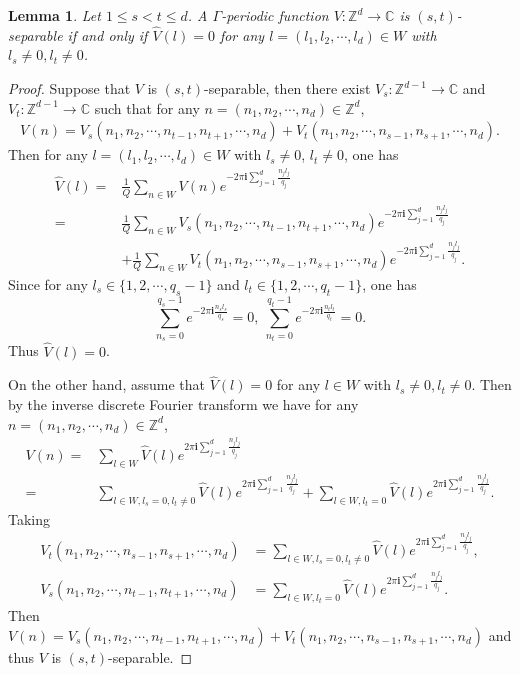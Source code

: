 \documentclass[12pt,letterpaper]{amsart}
\newtheorem{lemma}{Lemma}[section]
\def\C{{\mathbb C}}
\def\Z{{\mathbb Z}}
\begin{document}
\begin{lemma}\label{stseparablefermi}
Let $1\leq s<t\leq d$. A $\Gamma$-periodic function $V:\Z^d\to \C$ is $(s,t)$-separable if and only if $\hat{V}(l)=0$ for any $l=(l_1,l_2,\cdots,l_d)\in W$ with $l_s\neq 0,l_t\neq 0$.
\end{lemma}
\begin{proof}
Suppose that $V$ is $(s,t)$-separable, then there exist $V_s:\Z^{d-1}\to\C$ and $V_t:\Z^{d-1}\to\C$ such that for any $n=(n_1,n_2,\cdots,n_d)\in\Z^d$,
\begin{align}
V(n)=V_s({n}_1,{n}_2,\cdots,{n}_{t-1},{n}_{t+1},\cdots,{n}_d)+V_t({n}_1,{n}_2,\cdots,{n}_{s-1},{n}_{s+1},\cdots,{n}_d).\nonumber
\end{align}
Then for any $l=(l_1,l_2,\cdots,l_d)\in W$ with $l_s\neq 0$, $l_t\neq 0$, one has
\begin{align}
\hat{V}(l)=&\frac{1}{Q}\sum_{n\in W}V(n)e^{-2\pi \mathbf{i}\sum_{j=1}^d\frac{n_jl_j}{q_j}}\nonumber\\
=&\frac{1}{Q}\sum_{n\in W}V_s({n}_1,{n}_2,\cdots,{n}_{t-1},{n}_{t+1},\cdots,{n}_d)e^{-2\pi \mathbf{i}\sum_{j=1}^d\frac{n_jl_j}{q_j}}\nonumber\\
&+\frac{1}{Q}\sum_{n\in W}V_t({n}_1,{n}_2,\cdots,{n}_{s-1},{n}_{s+1},\cdots,{n}_d)e^{-2\pi \mathbf{i}\sum_{j=1}^d\frac{n_jl_j}{q_j}}.\nonumber
\end{align}
Since for any $l_s\in \{1,2,\cdots,q_s-1\}$ and $l_t\in \{1,2,\cdots,q_t-1\}$, one has
$$\sum_{n_s=0}^{q_s-1}e^{-2\pi\mathbf{i}\frac{n_sl_s}{q_s}}=0,\  \sum_{n_t=0}^{q_t-1}e^{-2\pi\mathbf{i}\frac{n_tl_t}{q_t}}=0.$$
Thus $\hat{V}(l)=0$.

On the other hand, assume that $\hat{V}(l)=0$ for any $l\in W$ with $l_s\neq0,l_t\neq 0$. Then by the inverse discrete Fourier transform we have for any $n=(n_1,n_2,\cdots,n_d)\in \Z^d$,
\begin{align}
V(n)=&\sum_{l\in W}\hat{V}(l)e^{2\pi\mathbf{i}\sum_{j=1}^d\frac{n_jl_j}{q_j}}\nonumber\\
=&\sum_{l\in W,l_s=0,l_t\neq 0}\hat{V}(l)e^{2\pi\mathbf{i}\sum_{j=1}^d\frac{n_jl_j}{q_j}}+\sum_{l\in W,l_t=0}\hat{V}(l)e^{2\pi\mathbf{i}\sum_{j=1}^d\frac{n_jl_j}{q_j}}.\nonumber
\end{align}
Taking
\begin{align}
V_t(n_1,n_2,\cdots,n_{s-1},n_{s+1},\cdots,n_d)&=\sum_{l\in W,l_s=0,l_t\neq 0}\hat{V}(l)e^{2\pi\mathbf{i}\sum_{j=1}^d\frac{n_jl_j}{q_j}},\nonumber\\
V_s(n_1,n_2,\cdots,n_{t-1},n_{t+1},\cdots,n_d)&=\sum_{l\in W,l_t=0}\hat{V}(l)e^{2\pi\mathbf{i}\sum_{j=1}^d\frac{n_jl_j}{q_j}}.\nonumber
\end{align}
Then $V(n)=V_s(n_1,n_2,\cdots,n_{t-1},n_{t+1},\cdots,n_d)+V_t(n_1,n_2,\cdots,n_{s-1},n_{s+1},\cdots,n_d)$ and thus $V$ is $(s,t)$-separable.
\end{proof}
\end{document}

